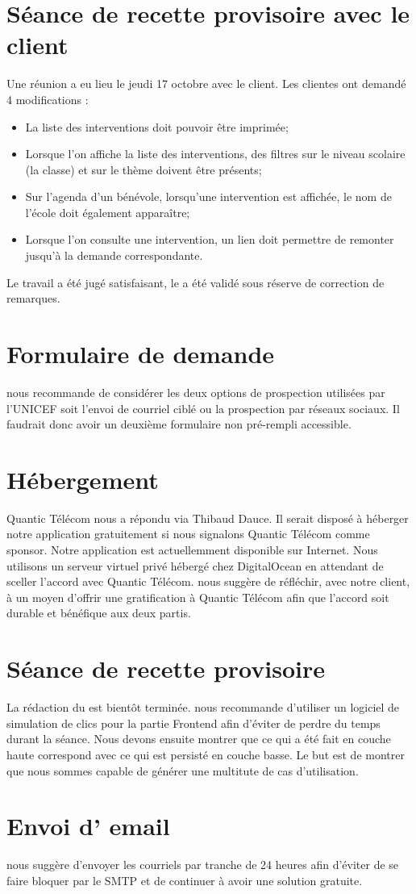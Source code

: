 \documentclass [a4paper] {article}
\begin{document}
\section{Séance de recette provisoire avec le client}
Une réunion a eu lieu le jeudi 17 octobre avec le client. Les clientes ont demandé 4 modifications : 
\begin{itemize}
	\item	La liste des interventions doit pouvoir être imprimée;
	\item	Lorsque l'on affiche la liste des interventions, des filtres sur le niveau scolaire (la classe) et sur le thème doivent être présents;
	\item	Sur l'agenda d'un bénévole, lorsqu'une intervention est affichée, le nom de l'école doit également apparaître;
	\item	Lorsque l'on consulte une intervention, un lien doit permettre de remonter jusqu'à la demande correspondante.
\end{itemize} 
Le travail a été jugé satisfaisant, le \CDR{} a été validé sous réserve de correction de remarques.

\section{Formulaire de demande}
\nomTuteurPedago{} nous recommande de considérer les deux options de prospection utilisées par l'UNICEF soit l'envoi de courriel ciblé ou la prospection par réseaux sociaux. 
Il faudrait donc avoir un deuxième formulaire non pré-rempli accessible.

\section{Hébergement}
Quantic Télécom nous a répondu via Thibaud Dauce. Il serait disposé à héberger notre application gratuitement si nous signalons Quantic Télécom comme sponsor. Notre application est actuellemment disponible sur Internet. Nous utilisons un serveur virtuel privé hébergé chez DigitalOcean en attendant de sceller l'accord avec Quantic Télécom. \nomTuteurPedago{} nous suggère de réfléchir, avec notre client, à un moyen d'offrir une gratification à Quantic Télécom afin que l'accord soit durable et bénéfique aux deux partis.

\section{Séance de recette provisoire}
La rédaction du \CDR{} est bientôt terminée. \nomTuteurPedago{} nous recommande d'utiliser un logiciel de simulation de clics pour la partie Frontend afin d'éviter de perdre du temps durant la séance. Nous devons ensuite montrer que ce qui a été fait en couche haute correspond avec ce qui est persisté en couche basse. Le but est de montrer que nous sommes capable de générer une multitute de cas d'utilisation.

\section{Envoi d' email}
\nomTuteurPedago{} nous suggère d'envoyer les courriels par tranche de 24 heures afin d'éviter de se faire bloquer par le SMTP et de continuer à avoir une solution gratuite.
\newpage
\end{document}
